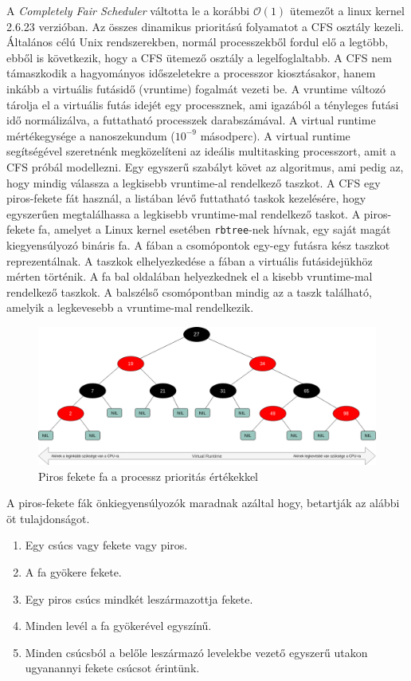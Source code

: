 
\label{sec:cfs}

A \textit{Completely Fair Scheduler} váltotta le a korábbi $\mathcal{O}(1)$ ütemezőt a linux kernel 2.6.23 verzióban.
Az összes dinamikus prioritású folyamatot a CFS osztály kezeli. Általános célú Unix rendszerekben, normál processzekből fordul elő a legtöbb, ebből is következik, hogy a CFS ütemező osztály a legelfoglaltabb.
A CFS nem támaszkodik a hagyományos időszeletekre a processzor kiosztásakor, hanem inkább a virtuális futásidő (vruntime) fogalmát vezeti be.
A vruntime változó tárolja el a virtuális futás idejét egy processznek, ami igazából a tényleges futási idő normálizálva, a futtatható processzek darabszámával.
A virtual runtime mértékegysége a nanoszekundum ($10^{-9}$ másodperc).
A virtual runtime segítségével szeretnénk megközelíteni az ideális multitasking processzort, amit a CFS próbál modellezni. Egy egyszerű szabályt követ az algoritmus, ami pedig az, hogy mindig válassza a legkisebb vruntime-al rendelkező taszkot. A CFS egy piros-fekete fát használ, a listában lévő futtatható taskok kezelésére, hogy egyszerűen megtalálhassa a legkisebb vruntime-mal rendelkező taskot.
A piros-fekete fa, amelyet a Linux kernel esetében \texttt{rbtree}-nek hívnak, egy saját magát kiegyensúlyozó bináris fa.
A fában a csomópontok egy-egy futásra kész taszkot reprezentálnak. A taszkok elhelyezkedése a fában a virtuális futásidejükhöz mérten történik. 
A fa bal oldalában helyezkednek el a kisebb vruntime-mal rendelkező taszkok.
A balszélső csomópontban mindig az a taszk található, amelyik a legkevesebb a vruntime-mal rendelkezik.
\begin{figure}[h]
\centering
\includegraphics[width=\textwidth]{images/redBlackTree.png}
\caption{Piros fekete fa a processz prioritás értékekkel}
\label{fig:rb_tree}
\end{figure}

\noindent A piros-fekete fák önkiegyensúlyozók maradnak azáltal hogy, betartják az alábbi öt tulajdonságot.
\begin{enumerate}
	\item Egy csúcs vagy fekete vagy piros.
	\item A fa gyökere fekete.
	\item Egy piros csúcs mindkét leszármazottja fekete.
	\item Minden levél a fa gyökerével egyszínű. 
	\item Minden csúcsból a belőle leszármazó levelekbe vezető egyszerű utakon ugyanannyi fekete csúcsot érintünk.
\end{enumerate}

